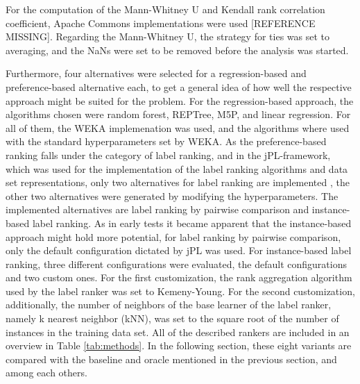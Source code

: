 For the computation of the Mann-Whitney U and Kendall rank correlation coefficient, Apache Commons implementations were used [REFERENCE MISSING]. Regarding the Mann-Whitney U, the strategy for ties was set to averaging, and the NaNs were set to be removed before the analysis was started.

Furthermore, four alternatives were selected for a regression-based and preference-based alternative each, to get a general idea of how well the respective approach might be suited for the problem. For the regression-based approach, the algorithms chosen were random forest, REPTree, M5P, and linear regression. For all of them, the WEKA implemenation \cite{hall2009weka} was used, and the algorithms where used with the standard hyperparameters set by WEKA. As the preference-based ranking falls under the category of label ranking, and in the jPL-framework, which was used for the implementation of the label ranking algorithms and data set representations, only two alternatives for label ranking are implemented \cite{intelligent2017jpl}, the other two alternatives were generated by modifying the hyperparameters. The implemented alternatives are label ranking by pairwise comparison and instance-based label ranking. As in early tests it became apparent that the instance-based approach might hold more potential, for label ranking by pairwise comparison, only the default configuration dictated by jPL was used. For instance-based label ranking, three different configurations were evaluated, the default configurations and two custom ones. For the first customization, the rank aggregation algorithm used by the label ranker was set to Kemeny-Young. For the second customization, additionally, the number of neighbors of the base learner of the label ranker, namely k nearest neighbor (kNN), was set to the square root of the number of instances in the training data set. All of the described rankers are included in an overview in Table \ref{tab:methods}. In the following section, these eight variants are compared with the baseline and oracle mentioned in the previous section, and among each others.

